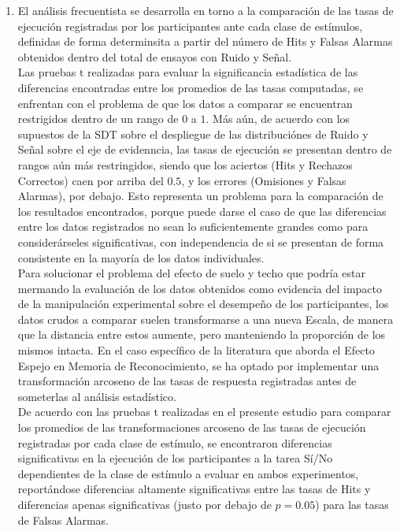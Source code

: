 \begin{enumerate}
\item El análisis frecuentista se desarrolla en torno a la comparación de las tasas de ejecución registradas por los participantes ante cada clase de estímulos, definidas de forma determinsita a partir del número de Hits y Falsas Alarmas obtenidos dentro del total de ensayos con Ruido y Señal.\\

Las pruebas t realizadas para evaluar la significancia estadística de las diferencias encontradas entre los promedios de las tasas computadas, se enfrentan con el problema de que los datos a comparar se encuentran restrigidos dentro de un rango de $0$ a $1$. Más aún, de acuerdo con los supuestos de la SDT sobre el despliegue de las distribuciónes de Ruido y Señal sobre el eje de evidenncia, las tasas de ejecución se presentan dentro de rangos aún más restringidos, siendo que los aciertos (Hits y Rechazos Correctos) caen por arriba del $0.5$, y los errores (Omisiones y Falsas Alarmas), por debajo. Esto representa un problema para la comparación de los resultados encontrados, porque puede darse el caso de que las diferencias entre los datos registrados no sean lo suficientemente grandes como para considerárseles significativas, con independencia de si se presentan de forma consistente en la mayoría de los datos individuales.\\

Para solucionar el problema del efecto de suelo y techo que podría estar mermando la evaluación de los datos obtenidos como evidencia del impacto de la manipulación experimental sobre el desempeño de los participantes, los datos crudos a comparar suelen transformarse a una nueva Escala, de manera que la distancia entre estos aumente, pero manteniendo la proporción de los mismos intacta. En el caso específico de la literatura que aborda el Efecto Espejo en Memoria de Reconocimiento, se ha optado por implementar una transformación arcoseno de las tasas de respuesta registradas antes de someterlas al análisis estadístico.\\

De acuerdo con las pruebas t realizadas en el presente estudio para comparar los promedios de las transformaciones arcoseno de las tasas de ejecución registradas por cada clase de estímulo, se encontraron diferencias significativas en la ejecución de los participantes a la tarea Sí/No dependientes de la clase de estímulo a evaluar en ambos experimentos, reportándose diferencias altamente significativas entre las tasas de Hits y diferencias apenas significativas (justo por debajo de $p=0.05$) para las tasas de Falsas Alarmas.\\


\end{enumerate}
